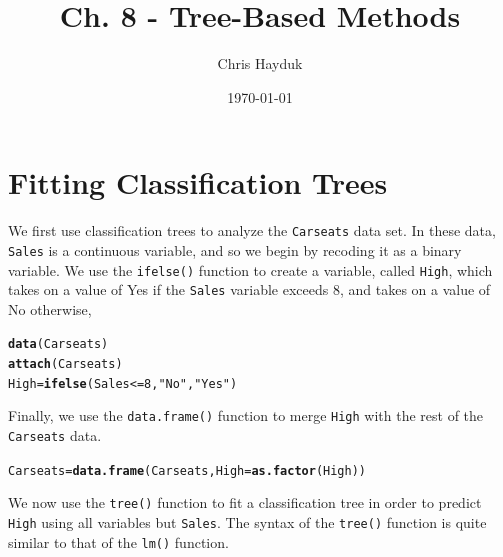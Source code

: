 \documentclass[12pt]{article}\usepackage[]{graphicx}\usepackage[]{color}
\makeatletter
\newcommand{\hlnum}[1]{\textcolor[rgb]{0.686,0.059,0.569}{#1}}%
\newcommand{\hlstr}[1]{\textcolor[rgb]{0.192,0.494,0.8}{#1}}%
\newcommand{\hlopt}[1]{\textcolor[rgb]{0,0,0}{#1}}%
\newcommand{\hlstd}[1]{\textcolor[rgb]{0.345,0.345,0.345}{#1}}%
\newcommand{\hlkwb}[1]{\textcolor[rgb]{0.69,0.353,0.396}{#1}}%
\newcommand{\hlkwc}[1]{\textcolor[rgb]{0.333,0.667,0.333}{#1}}%
\newcommand{\hlkwd}[1]{\textcolor[rgb]{0.737,0.353,0.396}{\textbf{#1}}}%
\newenvironment{kframe}{%
 \def\at@end@of@kframe{}%
 \ifinner\ifhmode%
  \def\at@end@of@kframe{\end{minipage}}%
  \begin{minipage}{\columnwidth}%
 \fi\fi%
 \def\FrameCommand##1{\hskip\@totalleftmargin \hskip-\fboxsep
 \colorbox{shadecolor}{##1}\hskip-\fboxsep
     \hskip-\linewidth \hskip-\@totalleftmargin \hskip\columnwidth}%
 \MakeFramed {\advance\hsize-\width
   \@totalleftmargin\z@ \linewidth\hsize
   \@setminipage}}%
 {\par\unskip\endMakeFramed%
 \at@end@of@kframe}
\newenvironment{knitrout}{}{} %
\makeatother
\begin{document}
\title{Ch. 8 - Tree-Based Methods}

\author{Chris Hayduk}
\date{\today}

\maketitle



\section{Fitting Classification Trees}

We first use classification trees to analyze the \texttt{Carseats} data set. In these data, \texttt{Sales} is a continuous variable, and so we begin by recoding it as a binary variable. We use the \texttt{ifelse()} function to create a variable, called \texttt{High}, which takes on a value of Yes if the \texttt{Sales} variable exceeds 8, and takes on a value of No otherwise,

\begin{knitrout}
\color{fgcolor}\begin{kframe}
\begin{alltt}
\hlkwd{data}\hlstd{(Carseats)}
\hlkwd{attach}\hlstd{(Carseats)}
\hlstd{High} \hlkwb{=} \hlkwd{ifelse}\hlstd{(Sales}\hlopt{<=}\hlnum{8}\hlstd{,} \hlstr{"No"}\hlstd{,} \hlstr{"Yes"}\hlstd{)}
\end{alltt}
\end{kframe}
\end{knitrout}

Finally, we use the \texttt{data.frame()} function to merge \texttt{High} with the rest of the \texttt{Carseats} data.

\begin{knitrout}
\color{fgcolor}\begin{kframe}
\begin{alltt}
\hlstd{Carseats} \hlkwb{=} \hlkwd{data.frame}\hlstd{(Carseats,} \hlkwc{High}\hlstd{=}\hlkwd{as.factor}\hlstd{(High))}
\end{alltt}
\end{kframe}
\end{knitrout}

We now use the \texttt{tree()} function to fit a classification tree in order to predict \texttt{High} using all variables but \texttt{Sales}. The syntax of the \texttt{tree()} function is quite similar to that of the \texttt{lm()} function.
\end{document}
